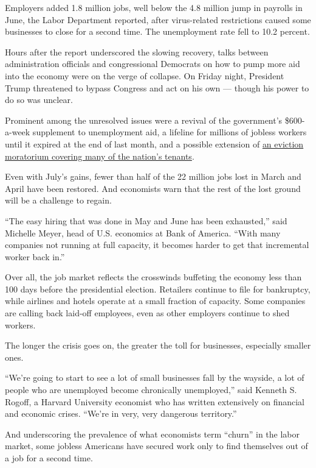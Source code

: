 Employers added 1.8 million jobs, well below the 4.8 million jump in
payrolls in June, the Labor Department reported, after virus-related
restrictions caused some businesses to close for a second time. The
unemployment rate fell to 10.2 percent.

Hours after the report underscored the slowing recovery, talks between
administration officials and congressional Democrats on how to pump more
aid into the economy were on the verge of collapse. On Friday night,
President Trump threatened to bypass Congress and act on his own ---
though his power to do so was unclear.

Prominent among the unresolved issues were a revival of the government's
\$600-a-week supplement to unemployment aid, a lifeline for millions of
jobless workers until it expired at the end of last month, and a
possible extension of
\href{https://www.nytimes.com/2020/08/07/business/economy/housing-economy-eviction-renters.html}{an
eviction moratorium covering many of the nation's tenants}.

Even with July's gains, fewer than half of the 22 million jobs lost in
March and April have been restored. And economists warn that the rest of
the lost ground will be a challenge to regain.

``The easy hiring that was done in May and June has been exhausted,''
said Michelle Meyer, head of U.S. economics at Bank of America. ``With
many companies not running at full capacity, it becomes harder to get
that incremental worker back in.''

Over all, the job market reflects the crosswinds buffeting the economy
less than 100 days before the presidential election. Retailers continue
to file for bankruptcy, while airlines and hotels operate at a small
fraction of capacity. Some companies are calling back laid-off
employees, even as other employers continue to shed workers.

The longer the crisis goes on, the greater the toll for businesses,
especially smaller ones.

``We're going to start to see a lot of small businesses fall by the
wayside, a lot of people who are unemployed become chronically
unemployed,'' said Kenneth S. Rogoff, a Harvard University economist who
has written extensively on financial and economic crises. ``We're in
very, very dangerous territory.''

And underscoring the prevalence of what economists term ``churn'' in the
labor market, some jobless Americans have secured work only to find
themselves out of a job for a second time.

